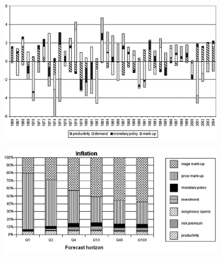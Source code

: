 \documentclass{beamer}
\begin{document}
\begin{frame}
  \begin{figure}
    \includegraphics[scale=.8]{sw_figure4_gdp.eps}
  \end{figure}
\end{frame}

\begin{frame}
  \begin{figure}
    \includegraphics[scale=.8]{sw_figure1_inflation.eps}
  \end{figure}
\end{frame}
\end{document}
